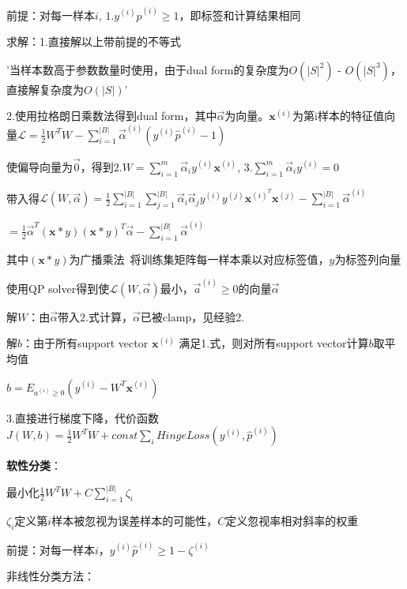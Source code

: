 \documentclass[UTF8]{ctexart}
\begin{document}
  \quad \quad 前提：对每一样本$i$, $1.y^{(i)}\hat{p}^{(i)} \geq 1$，即标签和计算结果相同

  \quad \quad 求解：1.直接解以上带前提的不等式

  \quad \quad \quad '当样本数高于参数数量时使用，由于dual form的复杂度为$O(|S|^2)$ - $O(|S|^3)$，直接解复杂度为$O(|S|)$'
  
  \quad \quad 2.使用拉格朗日乘数法得到dual form，其中$\vec{\alpha}$为向量。$\mathbf{x}^{(i)}$为第i样本的特征值向量$\mathcal{L} = \frac{1}{2}W^TW - \sum_{i=1}^{|B|}\vec{\alpha}^{(i)}(y^{(i)}\hat{p}^{(i)} - 1)$

  \quad \quad \quad 使偏导向量为$\vec{0} $，得到$2.W = \sum_{i=1}^{m}\vec{\alpha}_iy^{(i)}\mathbf{x}^{(i)}$, $3.\sum_{i=1}^{m}\vec{\alpha}_iy^{(i)}=0$

  \quad \quad \quad 带入得$\mathcal{L} (W, \vec{\alpha}) = \frac{1}{2}\sum_{i=1}^{|B|}\sum_{j=1}^{|B|}\vec{\alpha}_i\vec{\alpha}_jy^{(i)}y^{(j)}\mathbf{x}^{(i)^T}\mathbf{x}^{(j)} - \sum_{i=1}^{|B|}\vec{\alpha}^{(i)}$
  
  \quad \quad \quad \quad $=\frac{1}{2}\vec{\alpha}^T (\mathbf{x} * y)(\mathbf{x} * y)^T \vec{\alpha} - \sum_{i=1}^{|B|}\vec{\alpha}^{(i)}$

  \quad \quad \quad \quad 其中$(\mathbf{x} * y)$为广播乘法\ 将训练集矩阵每一样本乘以对应标签值，$y$为标签列向量

  \quad \quad \quad 使用QP solver得到使$\mathcal{L} (W, \vec{\alpha})$最小，$\vec{a}^{(i)} \geq 0$的向量$\vec{\alpha}$

  \quad \quad \quad 解$W$：由$\vec{\alpha}$带入2.式计算，$\vec{\alpha}$已被clamp，见经验2.

  \quad \quad \quad 解$b$：由于所有support vector $\mathbf{x}^{(i)}$ 满足1.式，则对所有support vector计算$b$取平均值

  \quad \quad \quad \quad $b = E_{a^{(i)} \geq 0}(y^{(i)}-W^T\mathbf{x}^{(i)})$

  \quad \quad 3.直接进行梯度下降，代价函数$J(W, b) = \frac{1}{2}W^TW + const \sum_i HingeLoss(y^{(i)}, \hat{p}^{(i)})$
  
  \quad \textbf{软性分类}：

  \quad \quad 最小化$\frac{1}{2}W^TW + C\sum_{i=1}^{|B|}\zeta_i $

  \quad \quad \quad $\zeta_i$定义第$i$样本被忽视为误差样本的可能性，$C$定义忽视率相对斜率的权重

  \quad \quad 前提：对每一样本$i$，$y^{(i)}\hat{p}^{(i)} \geq 1 - \zeta^{(i)}$

  非线性分类方法：
\end{document}

